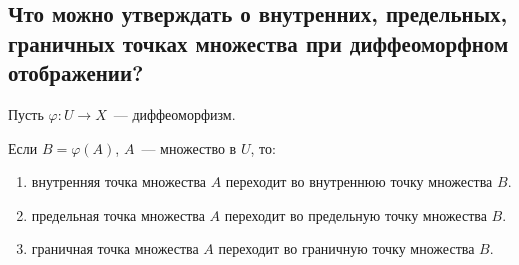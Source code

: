 
\subsection{Что можно утверждать о внутренних, предельных, граничных точках множества при диффеоморфном отображении?}

Пусть $\varphi : U \to X$~--- диффеоморфизм. 

Если $B = \varphi(A)$, $A$~--- множество в $U$, то:
\begin{enumerate}
    \item внутренняя точка множества $A$ переходит во внутреннюю точку множества $B$.
    \item предельная точка множества $A$ переходит во предельную точку множества $B$.
    \item граничная точка множества $A$ переходит во граничную точку множества $B$.
\end{enumerate}

